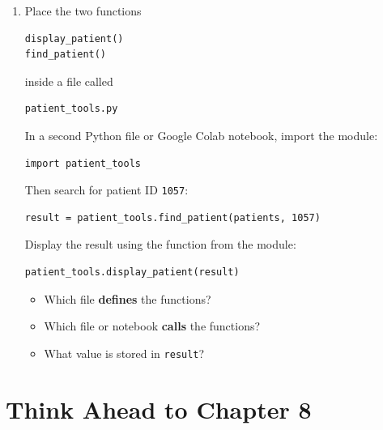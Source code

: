 \documentclass{article}
\begin{document}
\begin{enumerate}

\item Place the two functions

\begin{verbatim}
display_patient()
find_patient()
\end{verbatim}

inside a file called

\begin{verbatim}
patient_tools.py
\end{verbatim}

In a second Python file or Google Colab notebook, import the
module:

\begin{verbatim}
import patient_tools
\end{verbatim}

Then search for patient ID \texttt{1057}:

\begin{verbatim}
result = patient_tools.find_patient(patients, 1057)
\end{verbatim}

Display the result using the function from the module:

\begin{verbatim}
patient_tools.display_patient(result)
\end{verbatim}

\begin{itemize}

\item Which file \textbf{defines} the functions?

\item Which file or notebook \textbf{calls} the functions?

\item What value is stored in \texttt{result}?

\end{itemize}

\end{enumerate}


\section{Think Ahead to Chapter 8}
\end{document}
